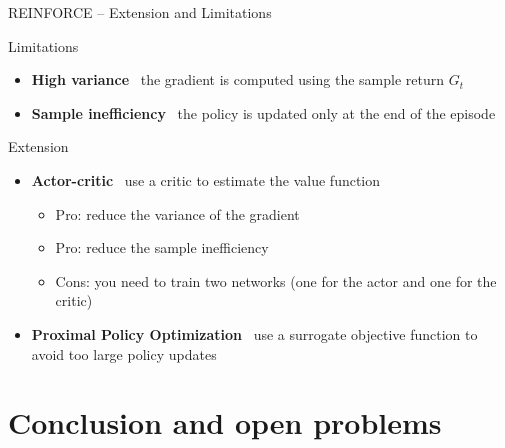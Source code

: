 \documentclass[presentation, 9pt]{beamer}\mode<presentation>{\usetheme{AMSBolognaFC}}
\begin{document}
\begin{frame}{REINFORCE -- Extension and Limitations}
\begin{exampleblock}{Limitations}
	\begin{itemize}
		\item \textbf{High variance} \faArrowRight \, the gradient is computed using the sample return $G_t$
		\item \textbf{Sample inefficiency} \faArrowRight \, the policy is updated only at the end of the episode
	\end{itemize}
\end{exampleblock}
\begin{exampleblock}{Extension}
	\begin{itemize}
		\item \textbf{Actor-critic} \faArrowRight \, use a critic to estimate the value function
		\begin{itemize}
			\item Pro: reduce the variance of the gradient
			\item Pro: reduce the sample inefficiency
			\item Cons: you need to train two networks (one for the actor and one for the critic)
		\end{itemize}
		\item \textbf{Proximal Policy Optimization} \faArrowRight \, use a surrogate objective function to avoid too large policy updates
	\end{itemize}
\end{exampleblock}
\end{frame}
\section{Conclusion and open problems}
\end{document}
